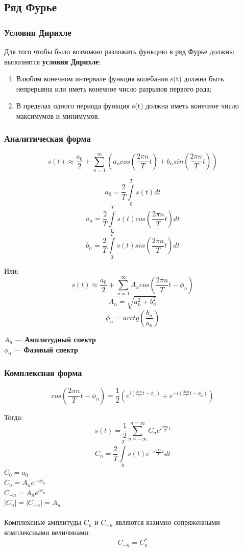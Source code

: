 \subsection{Ряд Фурье}
\subsubsection{Условия Дирихле}
Для того чтобы было возможно разложить функцию в ряд Фурье должны выполнятся \textbf{условия Дирихле}:
\begin{enumerate}
    \item Влюбом конечном интервале функция колебания s(t) должна быть непрерывна или иметь конечное число разрывов первого рода;
    \item В пределах одного периода функция s(t) должна иметь конечное число максимумов и минимумов.
\end{enumerate}

\subsubsection{Аналитическая форма}
$$s(t)\approx\frac{a_{0}}{2}+\sum\limits_{n=1}^{\infty}\left(a_{n}cos\left(\frac{2\pi n}{T}t\right)+b_{n}sin\left(\frac{2\pi n}{T}t\right)\right)$$

$$a_{0}=\frac{2}{T}\int\limits_{0}^{T}s(t)dt$$
$$a_{n}=\frac{2}{T}\int\limits_{0}^{T}s(t)cos\left(\frac{2\pi n}{T}t\right)dt$$
$$b_{n}=\frac{2}{T}\int\limits_{0}^{T}s(t)sin\left(\frac{2\pi n}{T}t\right)dt$$

Или:
$$s(t)\approx\frac{a_{0}}{2}+\sum\limits_{n=1}^{\infty}A_{n}cos(\frac{2\pi n}{T}t-\phi_{n})$$
$$A_{n}=\sqrt{a_{n}^{2}+b_{n}^{2}}$$
$$\phi_{n}=arctg\left(\frac{b_{n}}{a_{n}}\right)$$

\noindent$A_{n}$ --- \textbf{Амплитудный спектр}\\
$\phi_{n}$ --- \textbf{Фазовый спектр}

\subsubsection{Комплексная форма}

$$cos\left(\frac{2\pi n}{T}t-\phi_{n}\right)=\frac{1}{2}(e^{i\left(\frac{2\pi n}{T}t-\phi_{n}\right)}+e^{-i\left(\frac{2\pi n}{T}t-\phi_{n}\right)})$$

Тогда:
$$s(t)=\frac{1}{2}\sum\limits_{n=-\infty}^{n=\infty}C_{n}e^{i\frac{2\pi n}{T}t}$$
$$C_{n}=\frac{2}{T}\int\limits_{0}^{T}s(t)e^{-i\frac{2\pi n}{T}t}dt$$
$C_{0}=a_{0}$\\
$C_{n}=A_{n}e^{-i\phi_{n}}$\\
$C_{-n}=A_{n}e^{i\phi_{n}}$\\
$|C_{n}|=|C_{-n}|=A_{n}$
\\\\
Комплексные амплитуды $C_{n}$ и $C_{-n}$ являются взаимно сопряженными комплексными величинами:$$C_{-n}=C_{n}^{*}$$

